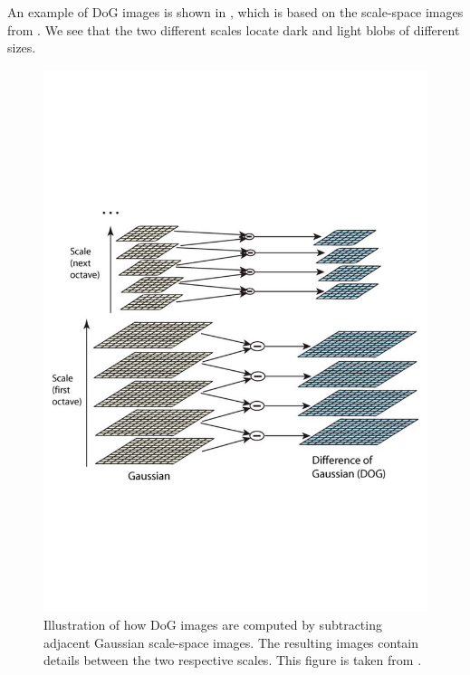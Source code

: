 \documentclass[thesis.tex]{subfiles}
\begin{document}
An example of DoG images is shown in , which is based on the scale-space images from . We see that the two different scales locate dark and light blobs of different sizes.
%
\begin{figure}[p]
	\centering
	\includegraphics[width=\textwidth,clip=true,trim=0 200 0 220]{img/SIFT_dogspaces.pdf}
	\caption{Illustration of how DoG images are computed by subtracting adjacent Gaussian scale-space images. The resulting images contain details between the two respective scales. This figure is taken from \citet[figure 1,pp. 95]{lowe2004distinctive}.}
	\label{fig:dogSpaces}
	\vspace{5mm}


\end{figure}
\end{document}
